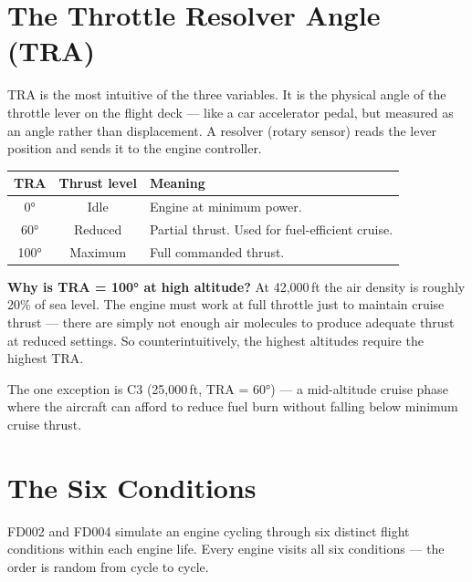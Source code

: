 \documentclass[11pt, a4paper]{article}
\begin{document}
\section{The Throttle Resolver Angle (TRA)}

TRA is the most intuitive of the three variables. It is the
physical angle of the throttle lever on the flight deck ---
like a car accelerator pedal, but measured as an angle rather
than displacement. A resolver (rotary sensor) reads the lever
position and sends it to the engine controller.

\begin{center}
\small
\begin{tabular}{@{}ccp{8cm}@{}}
  \toprule
  TRA & Thrust level & Meaning \\
  \midrule
  0°   & Idle    & Engine at minimum power. \\
  60°  & Reduced & Partial thrust. Used for fuel-efficient cruise. \\
  100° & Maximum & Full commanded thrust. \\
  \bottomrule
\end{tabular}
\end{center}

\begin{insightbox}
\textbf{Why is TRA = 100° at high altitude?}
At 42{,}000\,ft the air density is roughly 20\% of sea level.
The engine must work at full throttle just to maintain cruise
thrust --- there are simply not enough air molecules to produce
adequate thrust at reduced settings. So counterintuitively,
the highest altitudes require the highest TRA.

The one exception is C3 (25{,}000\,ft, TRA = 60°) --- a
mid-altitude cruise phase where the aircraft can afford to
reduce fuel burn without falling below minimum cruise thrust.
\end{insightbox}

\section{The Six Conditions}

FD002 and FD004 simulate an engine cycling through six distinct
flight conditions within each engine life. Every engine visits
all six conditions --- the order is random from cycle to cycle.
\end{document}

